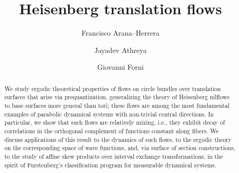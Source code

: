 \documentclass{amsart}
\theoremstyle{definition}
\theoremstyle{remark}
\numberwithin{equation}{section}
\newcommand{\<}{{\langle}}
\renewcommand{\>}{{\rangle}}
\begin{document}
\title[Heisenberg translation flows]{Heisenberg translation flows}



\author{Francisco Arana--Herrera}


\address{Department of Mathematics, Rice University,
Herman Brown Hall for Mathematical Sciences
6100 Main Street
Houston, TX 77005.}

\author{Jayadev Athreya}


\address{Department of Mathematics, Padelford Hall, 4110 E Stevens Way NE,  University of Washington, Seattle, WA, USA.}
	
\author{Giovanni Forni}


\address{Department of Mathematics, William E. Kirwan Hall, 4176 Campus Dr, University of Maryland, College Park, MD 20742, USA.}



\date{}

\begin{abstract}
    We study ergodic theoretical properties of flows on circle bundles over translation surfaces that arise via prequantization, generalizing the theory of Heisenberg nilflows to base surfaces more general than tori; these flows are among the most fundamental examples of parabolic dynamical systems with non-trivial central directions. In particular, we show that such flows are relatively mixing, i.e., they exhibit decay of correlations in the orthogonal complement of functions constant along fibers. We discuss applications of this result to the dynamics of such flows, to the ergodic theory on the corresponding space of wave functions, and, via surface of section constructions, to the study of affine skew products over interval exchange transformations, in the spirit of Furstenberg's classification program for measurable dynamical systems. 
\end{abstract}
\end{document}
